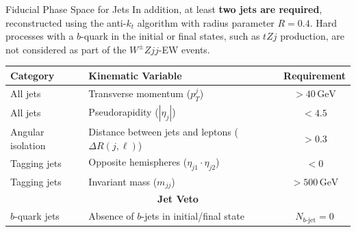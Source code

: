 \begin{frame}{Fiducial Phase Space for Jets}
    In addition, at least \textbf{two jets are required}, reconstructed using the anti-$k_t$ algorithm with radius parameter $R=0.4$. Hard processes with a $b$-quark in the initial or final states, such as $tZj$ production, are not considered as part of the $W^\pm Zjj$-EW events.
    
    \vspace{0.4cm} %
    
    \begin{center}
    \small %
    \renewcommand{\arraystretch}{1.3} %
    \begin{tabular}{llc}
    \hline
    \textbf{Category} & \textbf{Kinematic Variable} & \textbf{Requirement} \\
    \hline
    All jets & Transverse momentum ($p_T^j$) & $> 40\,\text{GeV}$ \\
    All jets & Pseudorapidity ($|\eta_j|$) & $< 4.5$ \\
    Angular isolation & Distance between jets and leptons ($\Delta R(j, \ell)$) & $> 0.3$ \\
    Tagging jets & Opposite hemispheres ($\eta_{j1} \cdot \eta_{j2}$) & $< 0$ \\
    Tagging jets & Invariant mass ($m_{jj}$) & $> 500\,\text{GeV}$ \\
    \hline
    \multicolumn{3}{c}{\textbf{Jet Veto}} \\
    \hline
    $b$-quark jets & Absence of $b$-jets in initial/final state & $N_{b\text{-jet}} = 0$ \\
    \hline
    \end{tabular}
    \end{center}
\end{frame}

